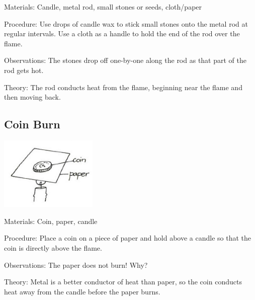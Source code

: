 \begin{multicols}{2}
\begin{description*}
\item[Materials:]{Candle, metal rod, small stones or seeds, cloth/paper}
\item[Procedure:]{Use drops of candle wax to stick small stones onto the metal rod at regular intervals. Use a cloth as a handle to hold the end of the rod over the flame.}
\item[Observations:]{The stones drop off one-by-one along the rod as that part of the rod gets hot.}
\item[Theory:]{The rod conducts heat from the flame, beginning near the flame and then moving back.}
\end{description*}

\subsection{Coin Burn}

\begin{center}
\includegraphics[width=0.35\textwidth]{./img/vso/coin-burn.png}
\end{center}

\begin{description*}
\item[Materials:]{Coin, paper, candle}
\item[Procedure:]{Place a coin on a piece of paper and hold above a candle so that the coin is directly above the flame.}
\item[Observations:]{The paper does not burn! Why?}
\item[Theory:]{Metal is a better conductor of heat than paper, so the coin conducts heat away from the candle before the paper burns.}
\end{description*}


\end{multicols}
